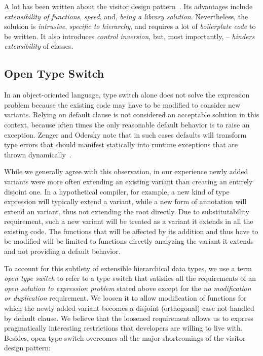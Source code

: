 A lot has been written about the visitor design pattern~\cite{DesignPatterns1993,Palsberg98,Zenger:2001,Oliveira08}. 
Its advantages include \emph{extensibility of functions}, \emph{speed}, and, 
\emph{being a library solution}. Nevertheless, the solution is \emph{intrusive}, 
\emph{specific to hierarchy}, and requires a lot of \emph{boilerplate code} to 
be written. It also introduces \emph{control inversion}, but, most importantly, 
-- \emph{hinders extensibility} of classes.


\subsection{Open Type Switch}

In an object-oriented language, type switch alone 
does not solve the expression problem because the existing code may have to be 
modified to consider new variants. Relying on default clause is not 
considered an acceptable solution in this context, because often times the 
only reasonable default behavior is to raise an exception. Zenger and Odersky 
note that in such cases defaults will transform type errors that should manifest 
statically into runtime exceptions that are thrown dynamically~\cite{fool12}.

While we generally agree with this observation, 
in our experience newly added variants were more often extending an existing 
variant than creating an entirely disjoint one. In a hypothetical compiler, for 
example, a new kind of type expression will typically extend a 
 variant, while a new form of annotation will extend an 
 variant, thus not extending the root  directly. 
Due to substitutability requirement, such a new variant will be treated as a 
variant it extends in all the existing code. The functions that will be affected 
by its addition and thus have to be modified will be limited to functions 
directly analyzing the variant it extends and not providing a default behavior.

To account for this subtlety of extensible hierarchical data types, we use a 
term \emph{open type switch} to refer to a type switch that satisfies all the 
requirements of an \emph{open solution to expression problem} stated above 
except for the \emph{no modification or duplication} requirement. We loosen it 
to allow modification of functions for which the newly added variant becomes a 
disjoint (orthogonal) case not handled by default clause. We believe that the 
loosened requirement allows us to express pragmatically interesting restrictions 
that developers are willing to live with. Besides, open type switch overcomes 
all the major shortcomings of the visitor design pattern:

